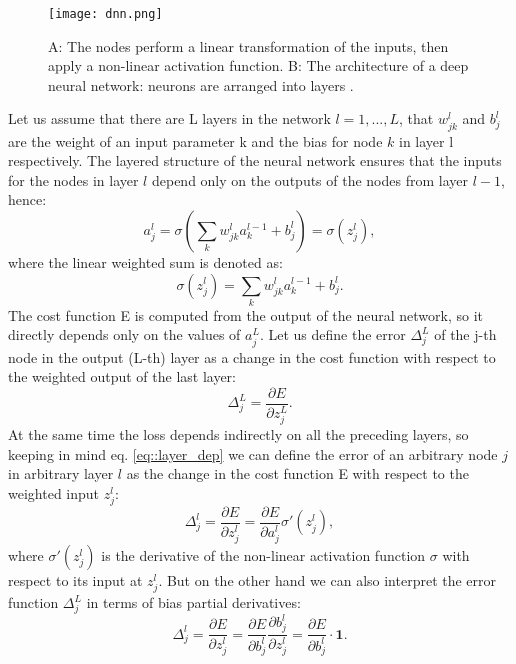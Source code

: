 \begin{figure}[htpb]
	\centering
	\texttt{[image: dnn.png]}
	\caption{A: The nodes perform a linear transformation of the inputs, then apply a non-linear activation function. B: The architecture of a deep neural network: neurons are arranged into layers \cite{dnn1}. }
	\label{fig::dnn}
\end{figure}
Let us assume that there are L layers in the network $l=1,...,L$, that $w^l_{jk}$ and $b^l_j$ are the weight of an input parameter k and the bias for node $k$ in layer l respectively. The layered structure of the neural network ensures that the inputs for the nodes in layer $l$ depend only on the outputs of the nodes from layer $l-1$, hence:
\begin{equation}
\label{eq::layer_dep}
a^l_j=\sigma\left(\sum_k w^l_{jk}a^{l-1}_k + b_j^l \right) = \sigma(z^l_j),
\end{equation}
where the linear weighted sum is denoted as:
\begin{equation}
\sigma(z^l_j)=\sum_k w^l_{jk}a^{l-1}_k + b_j^l.
\end{equation}
The cost function E is computed from the output of the neural network, so it directly depends only on the values of $a_j^L$. Let us define the error $\Delta_j^L$ of the j-th node in the output (L-th) layer as a change in the cost function with respect to the weighted output of the last layer:
\begin{equation}
\label{eq::bp1}
\Delta^L_j=\frac{\partial E}{\partial z_j^L}.
\end{equation}
At the same time the loss depends indirectly on all the preceding layers, so keeping in mind eq. \ref{eq::layer_dep} we can define the error of an arbitrary node $j$ in arbitrary layer $l$ as the change in the cost function E with respect to the weighted input $z^l_j$:
\begin{equation}
\Delta^l_j=\frac{\partial E}{\partial z_j^l}=\frac{\partial E}{\partial a^l_j}\sigma'(z^l_j),
\end{equation}
where $\sigma'(z^l_j)$ is the derivative of the non-linear activation function $\sigma$ with respect to its input at $z^l_j$. But on the other hand we can also interpret the error function  $\Delta^L_j$ in terms of bias partial derivatives:
\begin{equation}
\label{eq::bp2}
\Delta^l_j=\frac{\partial E}{\partial z_j^l}=\frac{\partial E}{\partial b^l_j}\frac{\partial b_j^l}{\partial z_j^l}=\frac{\partial E}{\partial b^l_j}\cdot \textbf{1}.
\end{equation}

